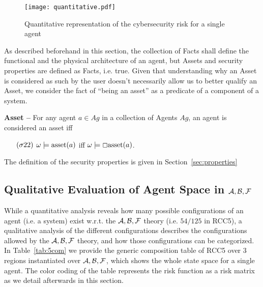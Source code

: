 \begin{figure}[t]
	\centering
	\texttt{[image: quantitative.pdf]}
	\caption{Quantitative representation of the cybersecurity risk for a single agent}
	\label{fig:quantitative}
\end{figure}

As described beforehand in this section, the collection of Facts shall define
the functional and the physical architecture of an agent, but Assets and
security properties are defined as Facts, i.e. true. Given that understanding
why an Asset is considered as such by the user doesn't necessarily allow
us to better qualify an Asset, we consider the fact of ``being an asset'' as
a predicate  of a component of a system. 

\begin{definition}{\bf Asset --}\label{def:asset}
For any agent $a\in Ag$ in a collection of Agents $Ag$, an agent is considered an asset iff 
	\begin{enumerate}[noitemsep]
		\item[$(\sigma22)$] $\omega\models\text{asset}({a})$ iff
			$\omega\models \Box\text{asset}({a})$.
	\end{enumerate}
\end{definition}

The definition of the security properties is given in Section~\ref{sec:properties}

\subsection{Qualitative Evaluation of Agent Space in $\mathcal{A},\mathcal{B},\mathcal{F}$}\label{sec:agentspace}
While a quantitative analysis reveals how many possible configurations of an
agent (i.e. a system) exist w.r.t. the $\mathcal{A},\mathcal{B},\mathcal{F}$ theory (i.e. $54/125$ in RCC5), a
qualitative analysis of the different configurations describes
the configurations allowed by the $\mathcal{A},\mathcal{B},\mathcal{F}$ theory, and how those configurations can be
categorized.  In Table~\ref{tab:5com} we provide the generic composition table
of RCC5 over 3 regions instantiated over $\mathcal{A},\mathcal{B},\mathcal{F}$, which shows the whole state
space for a single agent. The color coding of the table represents the 
risk function as a risk matrix as we detail afterwards in this section.

